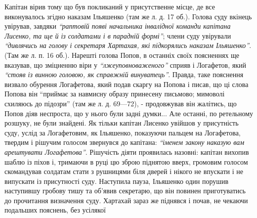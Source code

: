 \documentclass[a4paper,20pt]{report}
\begin{document}
Капітан вірив тому що був покликаний у присутственне місце, де все виконувалось
згідно наказам Ільяшенко (там же л. д. 17 об.). Голова суду вкінець увірував,
завдяки \emph{``раптовій появі начальника інвалідної команди капітана Лисенко,
та ще й із солдатами і в парадній формі''}; члени суду увірували \emph{``дивлячись на голову і секретаря Хартахая, які підкорялись
наказам Ільяшенко''}. (Там же л. п. 16 об.). Нарешті голова Попов, в останніх своїх поясненнях
ще вказував, що зміцненню віри у \emph{``лжеуповноваженого''} сприяв і Логафетов, який 
\emph{``стояв із винною головою, як справжній винуватець''}.
Правда, таке пояснення визвало обурення Логафетова, який подав скаргу на Попова і писав,
що ці слова Попова він ``приймає за навмисну образу принесену письмово; мимоволі
схиляюсь до підозри'' (там же л. д. 69—72), - продовжував він жалітись, що Попов діяв
неспроста, що у нього були задні думки... Але останні, по ретельному розшуку, не були знайдені.
Як тільки капітан Лисенко увійшов у присутність суду, услід за Логафетовим, як
Ільяшенко, показуючи пальцем на Логафетова, твердим і рішучим голосом звернувся
до капітана: \emph{``іменем закону наказую вам арештувати Логафетова''}.
Рішучість діяти проявилась назовні: капітан вихопив шаблю із піхов і, тримаючи
в руці цю зброю піднятою вверх, громовим голосом скомандував солдатам стати з
рушницями біля дверей і нікого не впускати і не випускати із присутності суду.
Наступила пауза, Ільяшенко один порушив наступившу гробову тишу та об'явив
секретарю, що він повинен приготуватись до прочитання визначення суду. Хартахай
зараз же піднявся і почав, не чекаючи подальших пояснень, без усілякої
\end{document}
